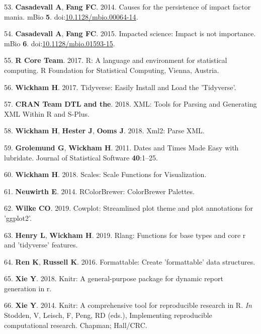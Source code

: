 \documentclass[11pt,]{article}
\begin{document}
\hypertarget{ref-Casadevall2014}{}
53. \textbf{Casadevall A}, \textbf{Fang FC}. 2014. Causes for the
persistence of impact factor mania. mBio \textbf{5}.
doi:\href{https://doi.org/10.1128/mbio.00064-14}{10.1128/mbio.00064-14}.

\hypertarget{ref-Casadevall2015}{}
54. \textbf{Casadevall A}, \textbf{Fang FC}. 2015. Impacted science:
Impact is not importance. mBio \textbf{6}.
doi:\href{https://doi.org/10.1128/mbio.01593-15}{10.1128/mbio.01593-15}.

\hypertarget{ref-R_software_2017}{}
55. \textbf{R Core Team}. 2017. R: A language and environment for
statistical computing. R Foundation for Statistical Computing, Vienna,
Austria.

\hypertarget{ref-wickham_tidyverse_2017}{}
56. \textbf{Wickham H}. 2017. Tidyverse: Easily Install and Load the
'Tidyverse'.

\hypertarget{ref-duncan_xml_2018}{}
57. \textbf{CRAN Team DTL and the}. 2018. XML: Tools for Parsing and
Generating XML Within R and S-Plus.

\hypertarget{ref-wickham_xml2_2018}{}
58. \textbf{Wickham H}, \textbf{Hester J}, \textbf{Ooms J}. 2018. Xml2:
Parse XML.

\hypertarget{ref-grolemund_dates_2011}{}
59. \textbf{Grolemund G}, \textbf{Wickham H}. 2011. Dates and Times Made
Easy with lubridate. Journal of Statistical Software \textbf{40}:1--25.

\hypertarget{ref-wickham_scales_2018}{}
60. \textbf{Wickham H}. 2018. Scales: Scale Functions for Visualization.

\hypertarget{ref-neuwirth_rcolorbrewer_2014}{}
61. \textbf{Neuwirth E}. 2014. RColorBrewer: ColorBrewer Palettes.

\hypertarget{ref-cowplot}{}
62. \textbf{Wilke CO}. 2019. Cowplot: Streamlined plot theme and plot
annotations for 'ggplot2'.

\hypertarget{ref-rlang}{}
63. \textbf{Henry L}, \textbf{Wickham H}. 2019. Rlang: Functions for
base types and core r and 'tidyverse' features.

\hypertarget{ref-formattable}{}
64. \textbf{Ren K}, \textbf{Russell K}. 2016. Formattable: Create
'formattable' data structures.

\hypertarget{ref-knitr_2018}{}
65. \textbf{Xie Y}. 2018. Knitr: A general-purpose package for dynamic
report generation in r.

\hypertarget{ref-knitr_2014}{}
66. \textbf{Xie Y}. 2014. Knitr: A comprehensive tool for reproducible
research in R. \emph{In} Stodden, V, Leisch, F, Peng, RD (eds.),
Implementing reproducible computational research. Chapman; Hall/CRC.
\end{document}
